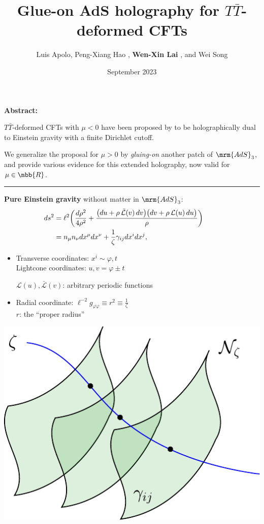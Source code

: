\documentclass[10pt]{article}
\title{Glue-on AdS holography for $T\bar T$-deformed CFTs}
\author{
	Luis Apolo,
	Peng-Xiang Hao \textkai{\normalsize 郝鹏翔},
	\textbf{Wen-Xin Lai} \textkai{\small 赖文昕},
	and Wei Song \textkai{\small 宋伟}
}
\date{September 2023}
\newcommand{\TTbar}{\texorpdfstring{\ensuremath{T\bar{T}}}{TTbar}\xspace}
\begin{document}
\maketitle
\thispagestyle{empty}


\begin{multicols}{3}

\noindent%
\textbf{Abstract:}

\TTbar-deformed CFTs with $\mu < 0$ have been proposed by \mbox{\textcite{McGough:2016lol}} to be holographically dual to Einstein gravity with a finite \mbox{Dirichlet} cutoff.

We generalize the proposal for $\mu > 0$ by \textit{gluing-on} another patch of $\mrm{AdS}_3$, and \mbox{provide} various evidence for this extended holography, now valid for $\mu \in \mbb{R}$.

\vspace{.8\baselineskip}
\hrule
\vspace{.3\baselineskip}

\textbf{Pure Einstein gravity} without matter in $\mrm{AdS}_3$:
\begin{equation}
\hspace{-2.5em}
\begin{aligned}
	ds^2
	&= \ell^2 \bigg( \frac{d\rho^2}{4 \rho^2} + \frac{ \big( du + \rho \, \mathcal {\bar L}(v)\, dv \big) \big( dv + \rho \, \mathcal L(u)\, du \big) }{\rho} \bigg)\\
	&= n_\mu n_\nu dx^\mu dx^\nu + \frac{1}{\zeta} \gamma_{ij}dx^i dx^j,\quad
\end{aligned}
\label{fggauge}
\end{equation}

\begin{itemize}
\item Transverse coordinates: $x^{i} \sim \varphi, t$ \\
	Lightcone coordinates: $u,v = \varphi \pm t$

	$\mathcal L(u), \bar{\mathcal L}(v)$: arbitrary periodic functions
\item Radial coordinate: $
	\ell^{-2} g_{\varphi\varphi} \equiv r^2 \equiv \frac{1}{\zeta}$\\
	$r$: the ``proper radius''
\end{itemize}
\begin{center}
	\vspace{-.5\baselineskip}
	\includegraphics[width=.52\linewidth]{img/foliation.pdf}
	

\end{center}
\end{multicols}
\end{document}
